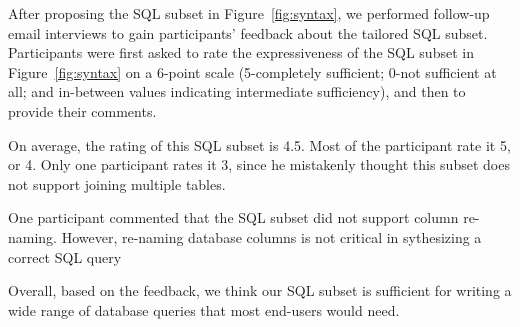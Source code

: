 After proposing the SQL subset in Figure~\ref{fig:syntax},
we performed follow-up email interviews to gain
participants' feedback about the tailored SQL
subset. Participants were first asked to rate
the expressiveness of the SQL subset in Figure~\ref{fig:syntax}
on a 6-point scale (5-completely
sufficient; 0-not sufficient at all;
and in-between values indicating intermediate sufficiency),
and then to provide their comments.

On average, the rating of this SQL subset is 4.5. Most of
the participant rate it 5, or 4. Only one participant rates
it 3, since he mistakenly thought this subset does not
support joining multiple tables. 

One participant commented that the SQL subset did not support
column re-naming. However, re-naming database columns is not
critical in sythesizing a correct SQL query 

Overall, based on the feedback, we think our SQL subset is
sufficient for writing a wide range of database queries
that most end-users would need.

